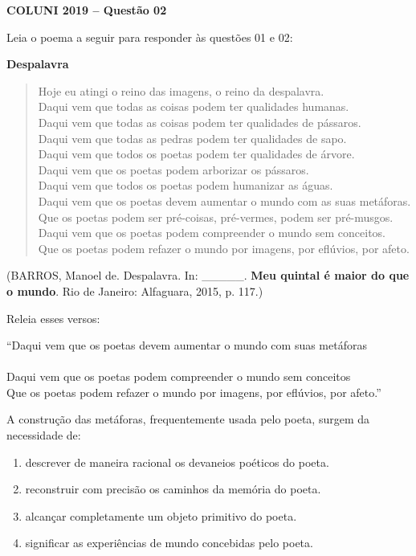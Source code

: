 \textbf{COLUNI 2019 -- Questão 02}\par\medskip Leia o poema a seguir para responder às questões 01 e 02:

\begin{center}\textbf{Despalavra}\end{center}
\begin{verse}
Hoje eu atingi o reino das imagens, o reino da despalavra.\\
Daqui vem que todas as coisas podem ter qualidades humanas.\\
Daqui vem que todas as coisas podem ter qualidades de pássaros.\\
Daqui vem que todas as pedras podem ter qualidades de sapo.\\
Daqui vem que todos os poetas podem ter qualidades de árvore.\\
Daqui vem que os poetas podem arborizar os pássaros.\\
Daqui vem que todos os poetas podem humanizar as águas.\\
Daqui vem que os poetas devem aumentar o mundo com as suas metáforas.\\
Que os poetas podem ser pré-coisas, pré-vermes, podem ser pré-musgos.\\
Daqui vem que os poetas podem compreender o mundo sem conceitos.\\
Que os poetas podem refazer o mundo por imagens, por eflúvios, por afeto.
\end{verse}
\begin{center}(BARROS, Manoel de. Despalavra. In: \_\_\_\_\_. \textbf{Meu quintal é maior do que o mundo}. Rio de Janeiro: Alfaguara, 2015, p. 117.)\end{center}

Releia esses versos:

\par

“Daqui vem que os poetas devem aumentar o mundo com suas metáforas\\
[...]\\
Daqui vem que os poetas podem compreender o mundo sem conceitos\\
Que os poetas podem refazer o mundo por imagens, por eflúvios, por afeto.”

\par

A construção das metáforas, frequentemente usada pelo poeta, surgem da necessidade de:\begin{enumerate}
\item descrever de maneira racional os devaneios poéticos do poeta.
\item reconstruir com precisão os caminhos da memória do poeta.
\item alcançar completamente um objeto primitivo do poeta.
\item significar as experiências de mundo concebidas pelo poeta.
\end{enumerate}
